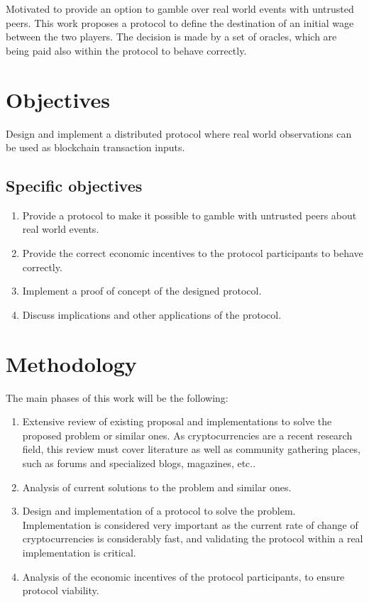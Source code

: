 Motivated to provide an option to gamble over real world events with untrusted
 peers.
This work proposes a protocol to define the destination of an initial wage
  between the two players.
The decision is made by a set of oracles, which are being paid also within the
  protocol to behave correctly.

\section{Objectives}
Design and implement a distributed protocol where real world observations can
  be used as blockchain transaction inputs.

\subsection{Specific objectives}
\begin{enumerate}
	\item Provide a protocol to make it possible to gamble with untrusted peers
	  about real world events.
	\item Provide the correct economic incentives to the protocol participants to
	  behave correctly.
	\item Implement a proof of concept of the designed protocol.
	\item Discuss implications and other applications of the protocol.
\end{enumerate}

\section{Methodology}
The main phases of this work will be the following:
\begin{enumerate}
	\item Extensive review of existing proposal and implementations to solve
	  the proposed problem or similar ones. As cryptocurrencies are a recent
	  research field, this review must cover literature as well as
	  community gathering places, such as forums and specialized blogs,
	  magazines, etc..
  \item Analysis of current solutions to the problem and similar ones.
  \item Design and implementation of a protocol to solve the problem.
    Implementation is considered very important as the current rate of change
    of cryptocurrencies is considerably fast, and validating the protocol within
    a real implementation is critical.
  \item Analysis of the economic incentives of the protocol participants, to
    ensure protocol viability.
\end{enumerate}

